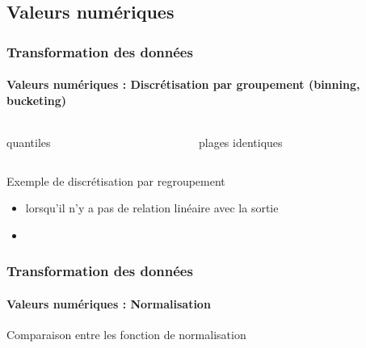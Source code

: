\documentclass[xcolor=table]{beamer}
\begin{document}
%	

\subsection{Valeurs numériques}

\begin{frame}
	\frametitle{Transformation des données}
	\framesubtitle{Valeurs numériques : Discrétisation par groupement (binning, bucketing)}
	
	\begin{columns}
		\begin{column}{0.5\textwidth}
			
			\vspace{-6pt}
			\begin{center}
				quantiles
			\end{center}
		\end{column}
		\begin{column}{0.5\textwidth}
			
			\vspace{-6pt}
			\begin{center}
				plages identiques
			\end{center}
		\end{column}
	\end{columns}

	\begin{center}
		Exemple de discrétisation par regroupement \cite{2021-google-prep}
	\end{center}

\begin{itemize}
	\item lorsqu'il n'y a pas de relation linéaire avec la sortie
	\item {}
\end{itemize}
	
\end{frame}

\begin{frame}
	\frametitle{Transformation des données}
	\framesubtitle{Valeurs numériques : Normalisation}
	
	
	\begin{center}
		Comparaison entre les fonction de normalisation \cite{2021-google-prep}
	\end{center}
	
\end{frame}
\end{document}
